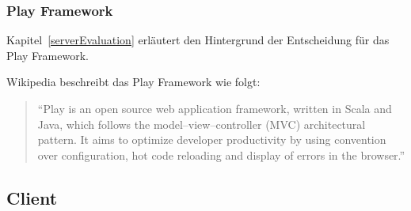 		\subsubsection{Play Framework}
			Kapitel~\ref{serverEvaluation} erläutert den Hintergrund der Entscheidung für das Play Framework. 
			
			Wikipedia beschreibt das Play Framework wie folgt:
			\begin{quote}
				"`Play is an open source web application framework, written in Scala and Java, which follows the model–view–controller (MVC) architectural pattern. It aims to optimize developer productivity by using convention over configuration, hot code reloading and display of errors in the browser."' \cite{builtwith_pty_ltd_framework_2014}
			\end{quote}

			

	\subsection{Client}

